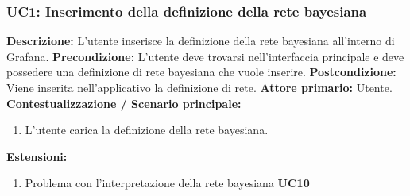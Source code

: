 		\subsubsection{UC1: Inserimento della definizione della rete bayesiana}
                	\textbf{Descrizione:} L'utente inserisce la definizione della rete bayesiana all'interno di Grafana.
                    \newline
                    \textbf{Precondizione:} L’utente deve trovarsi nell’interfaccia principale e deve possedere una definizione di rete bayesiana che vuole inserire.
                    \newline
                    \textbf{Postcondizione:} Viene inserita nell’applicativo la definizione di rete.
                    \newline
                    \textbf{Attore primario:} Utente.
                    \newline
                    \textbf{Contestualizzazione / Scenario principale:} 
		    \begin{enumerate}
		    	\item L’utente carica la definizione della rete bayesiana.
		    \end{enumerate}
                    \newpage
                    \textbf{Estensioni:} 
		    \begin{enumerate}
                            \item Problema con l’interpretazione della rete bayesiana \textbf{UC10}
                    \end{enumerate}
                        
